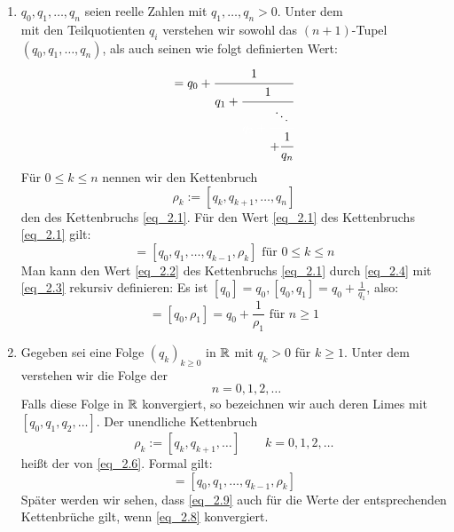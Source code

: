 \begin{defn} \label{def_2.4}
	\begin{enumerate}[1)]
		\item $q_0,q_1,\dots,q_n$ seien reelle Zahlen mit $q_1,\dots,q_n > 0$. Unter dem  
		\begin{equation}
			[q_0,q_1,\dots,q_n] \label{eq_2.1}
		\end{equation}
		mit den Teilquotienten $q_i$ verstehen wir sowohl das $(n+1)$-Tupel $(q_0,q_1,\dots,q_n)$, als auch seinen wie folgt definierten Wert:
		\begin{equation}
			[q_0,q_1,\dots,q_n] = q_0 + \cfrac{1}{q_1 + \cfrac{1}{\textcolor{white}{q_2 + \cfrac{\textcolor{black}{\ddots}}{\textcolor{black}{+\cfrac{1}{q_n}}}}}} \label{eq_2.2}
		\end{equation}
		Für $0 \leq k \leq n$ nennen wir den Kettenbruch
		\begin{equation}
			\rho_k := [q_k,q_{k+1},\dots,q_n] \label{eq_2.3}
		\end{equation}
		den  des Kettenbruchs \eqref{eq_2.1}. Für den Wert \eqref{eq_2.1} des Kettenbruchs \eqref{eq_2.1} gilt: 
		\begin{equation}
			[q_0,q_1,\dots,q_n] = [q_0,q_1,\dots,q_{k-1},\rho_k] \text{ für } 0 \leq k \leq n \label{eq_2.4}
		\end{equation}
		Man kann den Wert \eqref{eq_2.2} des Kettenbruchs \eqref{eq_2.1} durch \eqref{eq_2.4} mit \eqref{eq_2.3} rekursiv definieren: Es ist $[q_0] = q_0, [q_0,q_1] = q_0 + \frac{1}{q_1}$, also:
		\begin{equation}
			[q_0,q_1,\dots,q_n] = [q_0, \rho_1] = q_0 + \frac{1}{\rho_1} \text{ für } n \geq 1 \label{eq_2.5}
		\end{equation}
		\item Gegeben sei eine Folge $(q_k)_{k \geq 0}$ in $\mathbb{R}$ mit $q_k > 0$ für $k \geq 1$. Unter dem  
		\begin{equation}
			[q_0,q_1,q_2,\dots] \label{eq_2.6}
		\end{equation}
		verstehen wir die Folge der
		\begin{equation}
			[q_0,q_1,\dots,q_n] \qquad n=0,1,2,\dots \label{eq_2.7}
		\end{equation}
		Falls diese Folge in $\mathbb{R}$ konvergiert, so bezeichnen wir auch deren Limes mit $[q_0,q_1,q_2,\dots]$. Der unendliche Kettenbruch
		\begin{equation}
			\rho_k := [q_k,q_{k+1},\dots] \qquad k = 0,1,2,\dots \label{eq_2.8}
		\end{equation}
		heißt der  von \eqref{eq_2.6}. Formal gilt: 
		\begin{equation}
			[q_0,q_1,q_2,\dots] = [q_0,q_1,\dots,q_{k-1},\rho_k] \label{eq_2.9}
		\end{equation}
		Später werden wir sehen, dass \eqref{eq_2.9} auch für die Werte der entsprechenden Kettenbrüche gilt, wenn \eqref{eq_2.8} konvergiert.
	\end{enumerate}
\end{defn}

